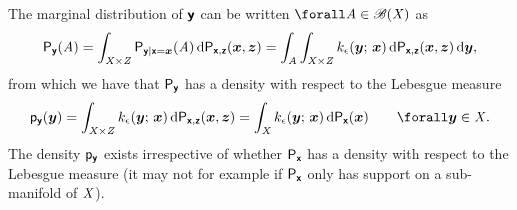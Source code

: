 The marginal distribution of $\boldsymbol{\mathsf{y}}$ can be written $\forall \set{A} \in \borel(\set{X})$ as
\begin{equation}
  \prob{\rvct{y}}(\set{A}) = 
  \int_{\set{X}\times\set{Z}} \prob{\rvct{y}|\rvct{x}=\vct{x}}\lpa \set{A} \rpa
  \,\dr\prob{\rvct{x},\rvct{z}}(\vct{x},\vct{z})
  =
  \int_{\set{A}} \int_{\set{X}\times\set{Z}}
    k_\epsilon(\vct{y};\,\vct{x})\,
  \dr\prob{\rvct{x},\rvct{z}}(\vct{x},\vct{z})\,\dr\vct{y},
\end{equation}
from which we have that $\mathsf{P}_{\boldsymbol{\mathsf{y}}}$ has a density with respect to the Lebesgue measure
\begin{equation}
  \pden{\rvct{y}}(\vct{y}) =
  \int_{\set{X}\times\set{Z}}
    k_\epsilon(\vct{y};\,\vct{x})\,
  \dr\prob{\rvct{x},\rvct{z}}(\vct{x},\vct{z}) =
  \int_{\set{X}}
    k_\epsilon(\vct{y};\,\vct{x})\,
  \dr\prob{\rvct{x}}(\vct{x})
  \qquad \forall \vct{y} \in \set{X}.
\end{equation}
The density $\mathsf{p}_{\boldsymbol{\mathsf{y}}}$ exists irrespective of whether $\mathsf{P}_{\boldsymbol{\mathsf{x}}}$ has a density with respect to the Lebesgue measure (it may not for example if $\mathsf{P}_{\boldsymbol{\mathsf{x}}}$ only has support on a sub-manifold of $\mathit{X}$).%

